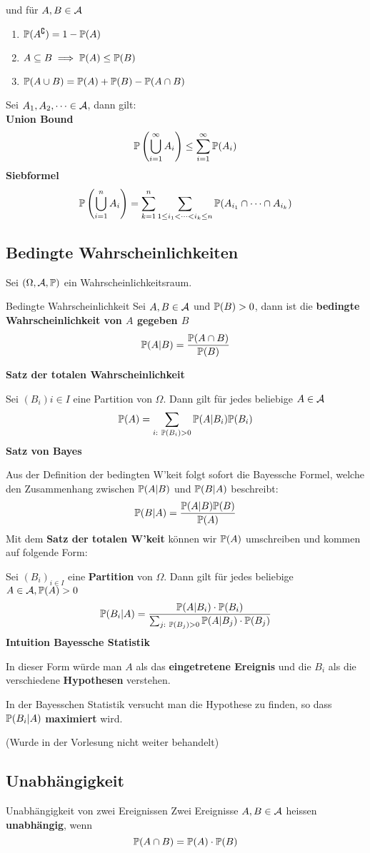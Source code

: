 und für $A, B \in \A$
\begin{enumerate}[label=\arabic*.]
    \item $\P(A^\complement) = 1 - \P(A)$
    \item $A \subseteq B \implies \P(A) \leq \P(B)$
    \item $\P(A \cup B) = \P(A)+\P(B)-\P(A \cap B)$
\end{enumerate}
Sei $A_1,A_2, \dots \in \A$, dann gilt:\\
\textbf{Union Bound}
    $$\P\left(\bigcup_{i=1}^{\infty} A_i \right) \leq \sum_{i=1}^{\infty}\P(A_i)$$
\textbf{Siebformel}
    $$\P\left(\bigcup_{i=1}^{n}A_i\right) = \sum_{k = 1}^{n}\sum_{1\leq i_1 < \dots < i_k \leq n} \P(A_{i_1} \cap \dots \cap A_{i_k})$$
\subsection{Bedingte Wahrscheinlichkeiten}
 Sei $(\Omega, \A, \P)$ ein Wahrscheinlichkeitsraum.
 \begin{mainbox}{Bedingte Wahrscheinlichkeit}
    Sei $A, B \in \A$ und $\P(B) > 0$, dann ist die \textbf{bedingte Wahrscheinlichkeit von $A$ gegeben $B$}
    $$\P(A|B) = \frac{\P(A \cap B)}{\P(B)}$$
 \end{mainbox}
\textbf{Satz der totalen Wahrscheinlichkeit}

Sei $(B_i){i\in I}$ eine Partition von $\Omega$. Dann gilt für jedes beliebige $A \in \A$
$$\P(A) = \sum_{i:\ \P(B_i)>0} \P(A|B_i)\P(B_i)$$
\textbf{Satz von Bayes}

Aus der Definition der bedingten W'keit folgt sofort die Bayessche Formel, welche den Zusammenhang zwischen $\P(A|B)$ und $\P(B|A)$ beschreibt:
$$\P(B|A) = \frac{\P(A|B)\P(B)}{\P(A)}$$
Mit dem \textbf{Satz der totalen W'keit} können wir $\P(A)$ umschreiben und kommen auf folgende Form:

Sei $(B_i)_{i\in I}$ eine \textbf{Partition} von $\Omega$. Dann gilt für jedes beliebige $A \in \A, \P(A) > 0$
$$\P(B_i|A) = \frac{\P(A|B_i)\cdot\P(B_i)}{\sum_{j:\ \P(B_j)>0}\P(A|B_j)\cdot \P(B_j)}$$
\textbf{Intuition Bayessche Statistik}

In dieser Form würde man $A$ als das \textbf{eingetretene Ereignis} und die $B_i$ als die verschiedene \textbf{Hypothesen} verstehen. 

In der Bayesschen Statistik versucht man die Hypothese zu finden, so dass $\P(B_i|A)$ \textbf{maximiert} wird.

(Wurde in der Vorlesung nicht weiter behandelt)
\subsection{Unabhängigkeit} 
\begin{mainbox}{Unabhängigkeit von zwei Ereignissen}
    Zwei Ereignisse $A, B \in \A$ heissen \textbf{unabhängig}, wenn 
    $$\P(A\cap B) = \P(A) \cdot \P(B)$$
\end{mainbox}

